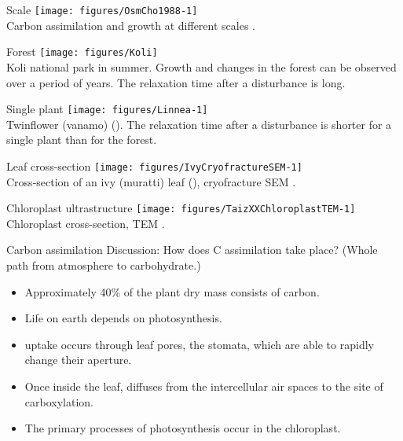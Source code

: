\documentclass[10pt]{beamer}
\begin{document}
\begin{frame}{Scale}
    \centering
    \texttt{[image: figures/OsmCho1988-1]}\\
    {\small Carbon assimilation and growth at different scales
    \autocite[from][]{OsmCho1988}.}
\end{frame}

\begin{frame}{Forest}
    \centering
    \texttt{[image: figures/Koli]}\\
    {\small Koli national park in summer. Growth and changes in the forest
    can be observed over a period of years. The relaxation time after a
    disturbance is long.}
\end{frame}

\begin{frame}{Single plant}
    \centering
    \texttt{[image: figures/Linnea-1]}\\
    {\small Twinflower (vanamo) (). The relaxation time after a disturbance is
    shorter for a single plant than for the forest.}
\end{frame}

\begin{frame}{Leaf cross-section}
    \centering
    \texttt{[image: figures/IvyCryofractureSEM-1]}\\
    {\small Cross-section of an ivy (muratti) leaf (), cryofracture SEM \autocite[from][]{Aphalo1991}.}
\end{frame}

\begin{frame}{Chloroplast ultrastructure}
    \centering
    \texttt{[image: figures/TaizXXChloroplastTEM-1]}\\
    {\small Chloroplast cross-section, TEM
    \autocite[from][]{TaiZei2006}.}
\end{frame}

\begin{frame}{Carbon assimilation}
    {Discussion: How does C assimilation take place? (Whole path from atmosphere to carbohydrate.)}

    \begin{itemize}
        \item Approximately 40\% of the plant dry mass consists of carbon.

        \item Life on earth depends on photosynthesis.

        \item \COtwo uptake occurs through leaf pores, the stomata, which are able
        to rapidly change their aperture.

        \item Once inside the leaf, \COtwo diffuses from the intercellular air
        spaces to the site of carboxylation.

        \item The primary processes of photosynthesis occur in the chloroplast.
    \end{itemize}
\end{frame}
\end{document}

